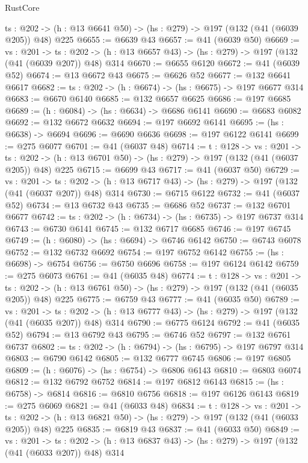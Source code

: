 \begin{lexlean}{RustCore}
\begin{coremodule}
  {ts : @202} -> (h : @13 @6641 @50) -> (hs : @279) -> @197 (@132 (@41 (@6039 @205)) @48) @225
@6655 := @6639 @43
@6657 := @41 (@6039 @50)
@6669 := {vs : @201} ->
  {ts : @202} -> (h : @13 @6657 @43) -> (hs : @279) -> @197 (@132 (@41 (@6039 @207)) @48) @314
@6670 := @6655 @6120
@6672 := @41 (@6039 @52)
@6674 := @13 @6672 @43
@6675 := @6626 @52
@6677 := @132 @6641 @6617
@6682 := {ts : @202} -> (h : @6674) -> (hs : @6675) -> @197 @6677 @314
@6683 := @6670 @6140
@6685 := @132 @6657 @6625
@6686 := @197 @6685
@6689 := (h : @6084) -> (hs : @6634) -> @6686 @6141
@6690 := @6683 @6082
@6692 := @132 @6672 @6632
@6694 := @197 @6692 @6141
@6695 := (hs : @6638) -> @6694
@6696 := @6690 @6636
@6698 := @197 @6122 @6141
@6699 := @275 @6077
@6701 := @41 (@6037 @48)
@6714 := {t : @128} ->
  {vs : @201} ->
  {ts : @202} -> (h : @13 @6701 @50) -> (hs : @279) -> @197 (@132 (@41 (@6037 @205)) @48) @225
@6715 := @6699 @43
@6717 := @41 (@6037 @50)
@6729 := {vs : @201} ->
  {ts : @202} -> (h : @13 @6717 @43) -> (hs : @279) -> @197 (@132 (@41 (@6037 @207)) @48) @314
@6730 := @6715 @6122
@6732 := @41 (@6037 @52)
@6734 := @13 @6732 @43
@6735 := @6686 @52
@6737 := @132 @6701 @6677
@6742 := {ts : @202} -> (h : @6734) -> (hs : @6735) -> @197 @6737 @314
@6743 := @6730 @6141
@6745 := @132 @6717 @6685
@6746 := @197 @6745
@6749 := (h : @6080) -> (hs : @6694) -> @6746 @6142
@6750 := @6743 @6078
@6752 := @132 @6732 @6692
@6754 := @197 @6752 @6142
@6755 := (hs : @6698) -> @6754
@6756 := @6750 @6696
@6758 := @197 @6124 @6142
@6759 := @275 @6073
@6761 := @41 (@6035 @48)
@6774 := {t : @128} ->
  {vs : @201} ->
  {ts : @202} -> (h : @13 @6761 @50) -> (hs : @279) -> @197 (@132 (@41 (@6035 @205)) @48) @225
@6775 := @6759 @43
@6777 := @41 (@6035 @50)
@6789 := {vs : @201} ->
  {ts : @202} -> (h : @13 @6777 @43) -> (hs : @279) -> @197 (@132 (@41 (@6035 @207)) @48) @314
@6790 := @6775 @6124
@6792 := @41 (@6035 @52)
@6794 := @13 @6792 @43
@6795 := @6746 @52
@6797 := @132 @6761 @6737
@6802 := {ts : @202} -> (h : @6794) -> (hs : @6795) -> @197 @6797 @314
@6803 := @6790 @6142
@6805 := @132 @6777 @6745
@6806 := @197 @6805
@6809 := (h : @6076) -> (hs : @6754) -> @6806 @6143
@6810 := @6803 @6074
@6812 := @132 @6792 @6752
@6814 := @197 @6812 @6143
@6815 := (hs : @6758) -> @6814
@6816 := @6810 @6756
@6818 := @197 @6126 @6143
@6819 := @275 @6069
@6821 := @41 (@6033 @48)
@6834 := {t : @128} ->
  {vs : @201} ->
  {ts : @202} -> (h : @13 @6821 @50) -> (hs : @279) -> @197 (@132 (@41 (@6033 @205)) @48) @225
@6835 := @6819 @43
@6837 := @41 (@6033 @50)
@6849 := {vs : @201} ->
  {ts : @202} -> (h : @13 @6837 @43) -> (hs : @279) -> @197 (@132 (@41 (@6033 @207)) @48) @314

\end{coremodule}
\end{lexlean}
